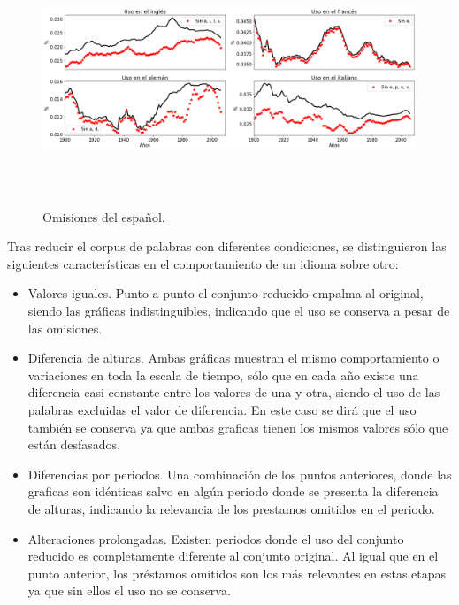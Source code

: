 \begin{figure}[h!]
	\centering
	\includegraphics[width=14cm, height=6.8cm]{Cap_5/OM_SP.png}
	\label{fig.OM_SP}
	\caption{Omisiones del español.}
\end{figure}


Tras reducir el corpus de palabras con diferentes condiciones, se distinguieron las siguientes características en el comportamiento de un idioma sobre otro:


\begin{itemize}
	
	\item Valores iguales. Punto a punto el conjunto reducido empalma al original, siendo las gráficas indistinguibles, indicando que el uso se conserva a pesar de las omisiones. 
		
	\item Diferencia de alturas. Ambas gráficas muestran el mismo comportamiento o variaciones en toda la escala de tiempo,  sólo que  en cada año existe una diferencia casi constante entre los valores de una y otra, siendo el uso de las palabras excluidas el valor de diferencia.  En este caso se dirá que el uso también se conserva ya que ambas graficas tienen los mismos valores sólo que están desfasados. 
	
	\item Diferencias por periodos. Una combinación de los puntos anteriores,  donde las graficas son idénticas salvo en algún periodo donde se presenta la diferencia de alturas, indicando la relevancia de los prestamos omitidos en el periodo. 
	
	\item Alteraciones prolongadas. Existen periodos donde el uso del conjunto reducido es completamente diferente al conjunto original. Al igual que en el punto anterior, los préstamos omitidos son los más relevantes en estas etapas ya que sin ellos el uso no se conserva.
			
\end{itemize}


